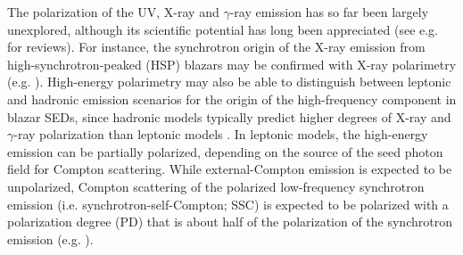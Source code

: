 \documentclass[twocolumn, tighten, twocolappendix]{aastex63}
\begin{document}
The polarization of the UV, X-ray and $\gamma$-ray emission has so far been largely unexplored, although its scientific potential has long been appreciated (see e.g. \cite{Krawczynski_etal2011, Andersson_etal2015, Zhang_2017, Mignani_etal2019, Rani_etal2019} for reviews). For instance, the synchrotron origin of the X-ray emission from high-synchrotron-peaked (HSP) blazars may be confirmed with X-ray polarimetry (e.g. \cite{Krawczynski_2012}). High-energy polarimetry may also be able to distinguish between leptonic and hadronic emission scenarios for the origin of the high-frequency component in blazar SEDs, since hadronic models typically predict higher degrees of X-ray and $\gamma$-ray polarization than leptonic models \citep{Zhang_Bottcher_2013, Paliya_etal2018, Zhang_etal2019}. In leptonic models, the high-energy emission can be partially polarized, depending on the source of the seed photon field for Compton scattering. While external-Compton emission is expected to be unpolarized, Compton scattering of the polarized low-frequency synchrotron emission (i.e. synchrotron-self-Compton; SSC) is expected to be polarized with a polarization degree (PD) that is about half of the polarization of the synchrotron emission (e.g. \cite{Chakraborty_etal2015}). 
\end{document}
